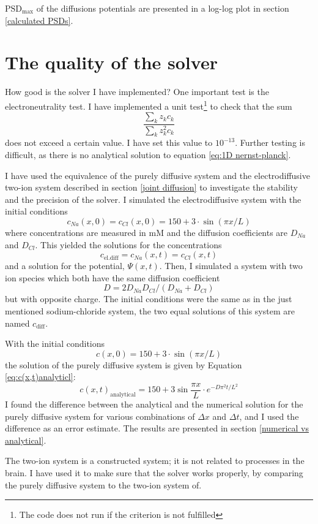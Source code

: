 \documentclass{uiophd}
\begin{document}
 
$\text{PSD}_{\text{max}}$ of the diffusions potentials are presented in a log-log plot in section \ref{calculated PSDs}. 

\section{The quality of the solver}
How good is the solver I have implemented? One important test is the electroneutrality test. I have implemented a unit test\footnote{The code does not run if the criterion is not fulfilled} to check that the sum 
$$\frac{\sum_k z_k c_k}{\sum_k z_k^2 c_k}$$
does not exceed a certain value. I have set this value to $10^{-13}$. Further testing is difficult, as there is no analytical solution to equation \ref{eq:1D nernst-planck}. 


I have used the equivalence of the purely diffusive system and the electrodiffusive two-ion system described in section \ref{joint diffusion} to investigate the stability and the precision of the solver. I simulated the electrodiffusive system with the initial conditions 
$$c_{Na}(x,0)=c_{Cl}(x,0)=150+3\cdot \sin(\pi x/L)$$
where concentrations are measured in mM and the diffusion coefficients are $D_{Na}$ and $D_{Cl}$. This yielded the solutions for the concentrations
$$c_{\text{el.diff}} =c_{Na}(x,t)=c_{Cl}(x,t)$$
and a solution for the potential, $\Psi(x,t)$. Then, I simulated a system with two ion species which both have the same diffusion coefficient 
$$D=2D_{Na}D_{Cl}/(D_{Na}+D_{Cl})$$ 
but with opposite charge. The initial conditions were the same as in the just mentioned sodium-chloride system, the two equal solutions of this system are named $c_{\text{diff}}$.

With the initial conditions 
$$c(x,0)=150+3\cdot \sin(\pi x/L)$$
 the solution of the purely diffusive system is given by Equation \ref{eq:c(x,t)analyticl}: 
$$c(x,t)_{\text{analytical}} =150 + 3 \sin \frac{ \pi x}{L}\cdot e^{-D\pi^2 t /L^2}$$
I found the difference between the analytical and the numerical solution for the purely diffusive system for various combinations of $\Delta x$ and $\Delta t$, and I used the difference as an error estimate. The results are presented in section \ref{numerical vs analytical}. 

The two-ion system is a constructed system; it is not related to processes in the brain. I have used it to make sure that the solver works properly, by comparing the purely diffusive system to the two-ion system of. 
\end{document}
